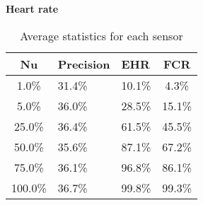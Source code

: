 \begin{table}[H]
  \vspace{4pt}

  \textbf{Heart rate}\vspace{2pt}
  \begin{tabularx}{\columnwidth}{cXXc}
    \toprule
    \textbf{Nu} & \textbf{Precision} & \textbf{EHR} & \textbf{FCR} \\
    \midrule
    1.0\% & 31.4\% & 10.1\% & 4.3\% \\ \hline
    5.0\% & 36.0\% & 28.5\% & 15.1\% \\ \hline
    25.0\% & 36.4\% & 61.5\% & 45.5\% \\ \hline
    50.0\% & 35.6\% & 87.1\% & 67.2\% \\ \hline
    75.0\% & 36.1\% & 96.8\% & 86.1\% \\ \hline
    100.0\% & 36.7\% & 99.8\% & 99.3\% \\ \hline
    \bottomrule
  \end{tabularx}

  \caption{Average statistics for each sensor}
  \label{[TABLE] avg_stats_sensors}
\end{table}